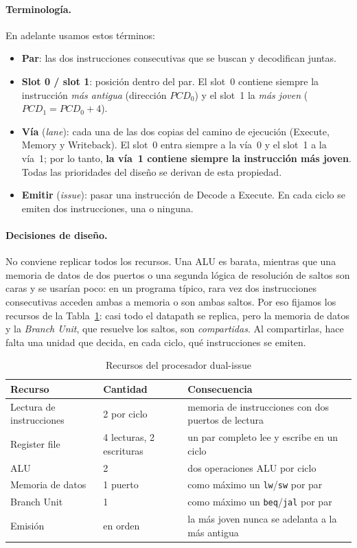 \documentclass[11pt,a4paper]{article}
\newcommand{\sig}[1]{\textit{#1}}
\newcommand{\ins}[1]{\texttt{#1}}
\begin{document}
\paragraph{Terminología.} En adelante usamos estos términos:
\begin{itemize}
  \item \textbf{Par}: las dos instrucciones consecutivas que se buscan y decodifican juntas.
  \item \textbf{Slot 0 / slot 1}: posición dentro del par. El slot~0 contiene siempre la
        instrucción \emph{más antigua} (dirección $\sig{PCD}_0$) y el slot~1 la
        \emph{más joven} ($\sig{PCD}_1 = \sig{PCD}_0 + 4$).
  \item \textbf{Vía} (\emph{lane}): cada una de las dos copias del camino de ejecución
        (Execute, Memory y Writeback). El slot~0 entra siempre a la vía~0 y el slot~1 a la
        vía~1; por lo tanto, \textbf{la vía~1 contiene siempre la instrucción más joven}.
        Todas las prioridades del diseño se derivan de esta propiedad.
  \item \textbf{Emitir} (\emph{issue}): pasar una instrucción de Decode a Execute. En cada
        ciclo se emiten dos instrucciones, una o ninguna.
\end{itemize}

\paragraph{Decisiones de diseño.} No conviene replicar todos los recursos. Una ALU es
barata, mientras que una memoria de datos de dos puertos o una segunda lógica de
resolución de saltos son caras y se usarían poco: en un programa típico, rara vez dos
instrucciones consecutivas acceden ambas a memoria o son ambas saltos. Por eso fijamos los
recursos de la Tabla~\ref{tab:resources}: casi todo el datapath se replica, pero la
memoria de datos y la \emph{Branch Unit}, que resuelve los saltos, son
\emph{compartidas}. Al compartirlas, hace falta una unidad que decida, en cada ciclo, qué
instrucciones se emiten.

\begin{table}[htbp]
\centering\small
\caption{Recursos del procesador dual-issue}
\label{tab:resources}
\begin{tabular}{@{}lll@{}}
\toprule
Recurso & Cantidad & Consecuencia \\
\midrule
Lectura de instrucciones & 2 por ciclo & memoria de instrucciones con dos puertos de lectura \\
Register file & 4 lecturas, 2 escrituras & un par completo lee y escribe en un ciclo \\
ALU & 2 & dos operaciones ALU por ciclo \\
Memoria de datos & 1 puerto & como máximo un \ins{lw}/\ins{sw} por par \\
Branch Unit & 1 & como máximo un \ins{beq}/\ins{jal} por par \\
Emisión & en orden & la más joven nunca se adelanta a la más antigua \\
\bottomrule
\end{tabular}
\end{table}
\end{document}
